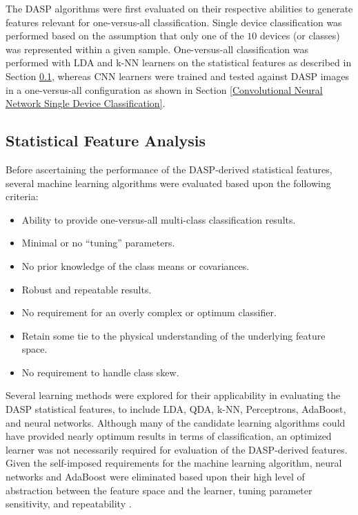 The DASP algorithms were first evaluated on their respective abilities to generate features relevant for one-versus-all classification.  Single device classification was performed based on the assumption that only one of the $10$ devices (or classes) was represented within a given sample.  One-versus-all classification was performed with LDA and k-NN learners on the statistical features as described in Section \ref{Statistical Features Single Device Classification}, whereas CNN learners were trained and tested against DASP images in a one-versus-all configuration as shown in Section \ref{Convolutional Neural Network Single Device Classification}.

\subsection[Statistical Feature Analysis]{Statistical Feature Analysis}
\label{Statistical Features Single Device Classification}

Before ascertaining the performance of the DASP-derived statistical features, several machine learning algorithms were evaluated based upon the following criteria:

\begin{itemize}
  \item Ability to provide one-versus-all multi-class classification results.
  \item Minimal or no “tuning” parameters.
	\item No prior knowledge of the class means or covariances.
	\item Robust and repeatable results.
	\item No requirement for an overly complex or optimum classifier.
	\item Retain some tie to the physical understanding of the underlying feature space.
	\item No requirement to handle class skew.
\end{itemize}
\label{list:ml_eval}

Several learning methods were explored for their applicability in evaluating the DASP statistical features, to include LDA, QDA, k-NN, Perceptrons, AdaBoost, and neural networks.  Although many of the candidate learning algorithms could have provided nearly optimum results in terms of classification, an optimized learner was not necessarily required for evaluation of the DASP-derived features.  Given the self-imposed requirements for the machine learning algorithm, neural networks and AdaBoost were eliminated based upon their high level of abstraction between the feature space and the learner, tuning parameter sensitivity, and repeatability \cite{Friedman2001}. 

